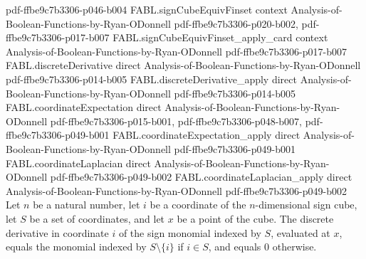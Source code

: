 \begin{theorem}
  {pdf-ffbe9c7b3306-p046-b004}
\proofstep
  {FABL.signCubeEquivFinset}
  {context}
  {Analysis-of-Boolean-Functions-by-Ryan-ODonnell}
  {pdf-ffbe9c7b3306-p020-b002,
    pdf-ffbe9c7b3306-p017-b007}
\proofstep
  {FABL.signCubeEquivFinset_apply_card}
  {context}
  {Analysis-of-Boolean-Functions-by-Ryan-ODonnell}
  {pdf-ffbe9c7b3306-p017-b007}
\proofstep
  {FABL.discreteDerivative}
  {direct}
  {Analysis-of-Boolean-Functions-by-Ryan-ODonnell}
  {pdf-ffbe9c7b3306-p014-b005}
\proofstep
  {FABL.discreteDerivative_apply}
  {direct}
  {Analysis-of-Boolean-Functions-by-Ryan-ODonnell}
  {pdf-ffbe9c7b3306-p014-b005}
\proofstep
  {FABL.coordinateExpectation}
  {direct}
  {Analysis-of-Boolean-Functions-by-Ryan-ODonnell}
  {pdf-ffbe9c7b3306-p015-b001,
    pdf-ffbe9c7b3306-p048-b007,
    pdf-ffbe9c7b3306-p049-b001}
\proofstep
  {FABL.coordinateExpectation_apply}
  {direct}
  {Analysis-of-Boolean-Functions-by-Ryan-ODonnell}
  {pdf-ffbe9c7b3306-p049-b001}
\proofstep
  {FABL.coordinateLaplacian}
  {direct}
  {Analysis-of-Boolean-Functions-by-Ryan-ODonnell}
  {pdf-ffbe9c7b3306-p049-b002}
\proofstep
  {FABL.coordinateLaplacian_apply}
  {direct}
  {Analysis-of-Boolean-Functions-by-Ryan-ODonnell}
  {pdf-ffbe9c7b3306-p049-b002}
Let $n$ be a natural number, let $i$ be a coordinate of the $n$-dimensional sign cube,
let $S$ be a set of coordinates, and let $x$ be a point of the cube. The discrete
derivative in coordinate $i$ of the sign monomial indexed by $S$, evaluated at $x$,
equals the monomial indexed by $S\setminus\{i\}$ if $i\in S$, and equals $0$ otherwise.
\end{theorem}


